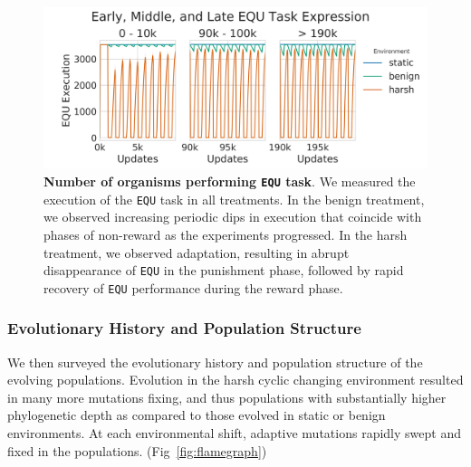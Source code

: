 \documentclass[10pt,letterpaper,final]{article}
\begin{document}
	\begin{figure}[!h]
	\includegraphics[width=0.95\columnwidth]{figures/CE/CCE_equ_execution.png}
	\caption{\textbf{Number of organisms performing \texttt{EQU} task}. We measured the execution of the \texttt{EQU} task in all treatments. In the benign treatment, we observed increasing periodic dips in execution that coincide with phases of non-reward as the experiments progressed. In the harsh treatment, we observed adaptation, resulting in abrupt disappearance of \texttt{EQU} in the punishment phase, followed by rapid recovery of \texttt{EQU} performance during the reward phase.
	}
	\label{fig:CCE_equ_execution} %
	\end{figure}

\subsubsection*{Evolutionary History and Population Structure}
We then surveyed the evolutionary history and population structure of the evolving populations. Evolution in the harsh cyclic changing environment resulted in many more mutations fixing, and thus populations with substantially higher phylogenetic depth as compared to those evolved in static or benign environments. At each environmental shift, adaptive mutations rapidly swept and fixed in the populations. (Fig~\ref{fig:flamegraph})
\end{document}
